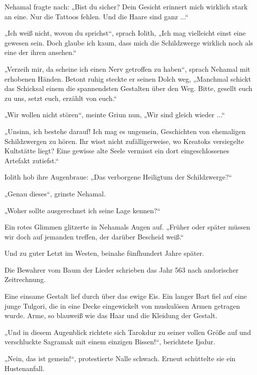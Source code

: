 Nehamal fragte nach: „Bist du sicher? Dein Gesicht erinnert mich wirklich stark an eine. Nur die Tattoos fehlen. Und die Haare sind ganz ...“

„Ich weiß nicht, wovon du sprichst“, sprach Iolith, „Ich mag vielleicht einst eine gewesen sein. Doch glaube ich kaum, dass mich die Schildzwerge wirklich noch als eine der ihren ansehen.“

„Verzeih mir, da scheine ich einen Nerv getroffen zu haben“, sprach Nehamal mit erhobenen Händen. Betont ruhig steckte er seinen Dolch weg, „Manchmal schickt das Schicksal einem die spannendsten Gestalten über den Weg. Bitte, gesellt euch zu uns, setzt euch, erzählt von euch.“

„Wir wollen nicht stören“, meinte Griun nun, „Wir sind gleich wieder ...“

„Unsinn, ich bestehe darauf! Ich mag es ungemein, Geschichten von ehemaligen Schildzwergen zu hören. Ihr wisst nicht zufälligerweise, wo Kreatoks versiegelte Kultstätte liegt? Eine gewisse alte Seele vermisst ein dort eingeschlossenes Artefakt zutiefst.“

Iolith hob ihre Augenbraue: „Das verborgene Heiligtum der Schildzwerge?“

„Genau dieses“, grinste Nehamal.

„Woher sollte ausgerechnet ich seine Lage kennen?“

Ein rotes Glimmen glitzerte in Nehamals Augen auf. „Früher oder später müssen wir doch auf jemanden treffen, der darüber Bescheid weiß.“








Und zu guter Letzt im Westen, beinahe fünfhundert Jahre später.\bigskip



Die Bewahrer vom Baum der Lieder schrieben das Jahr 563 nach andorischer Zeitrechnung.

Eine einsame Gestalt lief durch über das ewige Eis. Ein langer Bart fiel auf eine junge Tulgori, die in eine Decke eingewickelt von muskulösen Armen getragen wurde. Arme, so blauweiß wie das Haar und die Kleidung der Gestalt.

„Und in diesem Augenblick richtete sich Tarokdur zu seiner vollen Größe auf und verschluckte Sagramak mit einem einzigen Bissen!“, berichtete Ijsdur.

„Nein, das ist gemein!“, protestierte Nalle schwach. Erneut schüttelte sie ein Hustenanfall.

